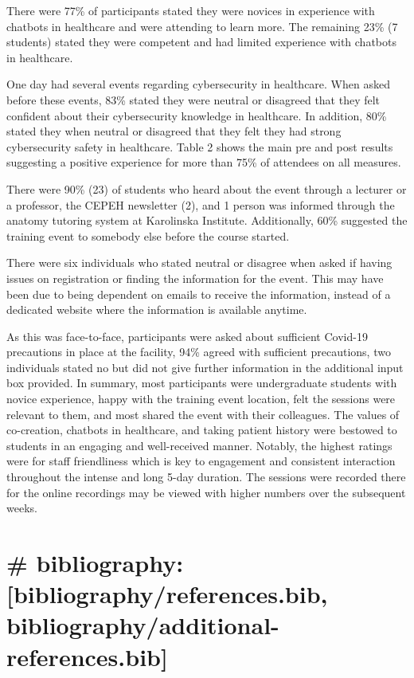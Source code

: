 \documentclass[a4paper, nobind]{templates/ociamthesis}
\begin{document}
There were 77\% of participants stated they were novices in experience with chatbots in healthcare and were attending to learn more. The remaining 23\% (7 students) stated they were competent and had limited experience with chatbots in healthcare.

One day had several events regarding cybersecurity in healthcare. When asked before these events, 83\% stated they were neutral or disagreed that they felt confident about their cybersecurity knowledge in healthcare. In addition, 80\% stated they when neutral or disagreed that they felt they had strong cybersecurity safety in healthcare. Table 2 shows the main pre and post results suggesting a positive experience for more than 75\% of attendees on all measures.

There were 90\% (23) of students who heard about the event through a lecturer or a professor, the CEPEH newsletter (2), and 1 person was informed through the anatomy tutoring system at Karolinska Institute. Additionally, 60\% suggested the training event to somebody else before the course started.

There were six individuals who stated neutral or disagree when asked if having issues on registration or finding the information for the event. This may have been due to being dependent on emails to receive the information, instead of a dedicated website where the information is available anytime.

As this was face-to-face, participants were asked about sufficient Covid-19 precautions in place at the facility, 94\% agreed with sufficient precautions, two individuals stated no but did not give further information in the additional input box provided.
In summary, most participants were undergraduate students with novice experience, happy with the training event location, felt the sessions were relevant to them, and most shared the event with their colleagues. The values of co-creation, chatbots in healthcare, and taking patient history were bestowed to students in an engaging and well-received manner. Notably, the highest ratings were for staff friendliness which is key to engagement and consistent interaction throughout the intense and long 5-day duration. The sessions were recorded there for the online recordings may be viewed with higher numbers over the subsequent weeks.

\hypertarget{bibliography-bibliographyreferences.bib-bibliographyadditional-references.bib}{%
\section{\# bibliography: {[}bibliography/references.bib, bibliography/additional-references.bib{]}}\label{bibliography-bibliographyreferences.bib-bibliographyadditional-references.bib}}
\end{document}

